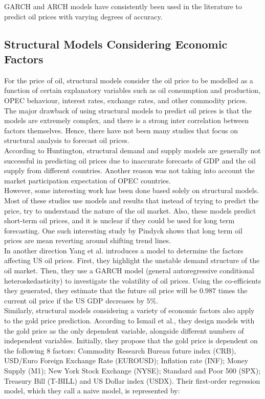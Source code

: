\documentclass[runningheads]{llncs}
\begin{document}
\noindent GARCH and ARCH models have consistently been used in the literature to predict oil prices with varying degrees of accuracy. 

\subsection{Structural Models Considering Economic Factors}

For the price of oil, structural models consider the oil price to be modelled as a function of certain explanatory variables such as oil consumption and production, OPEC behaviour, interest rates, exchange rates, and other commodity prices. The major drawback of using structural models to predict oil prices is that the models are extremely complex, and there is a strong inter correlation between factors themselves. Hence, there have not been many studies that focus on structural analysis to forecast oil prices.\\

\noindent According to Huntington\cite{huntington}, structural demand and supply models are generally not successful in predicting oil prices due to inaccurate forecasts of GDP and the oil supply from different countries. Another reason was not taking into account the market participation expectation of OPEC countries. \\

\noindent However, some interesting work has been done based solely on structural models. Most of these studies use models and results that instead of trying to predict the price, try to understand the nature of the oil market. Also, these models predict short-term oil prices, and it is unclear if they could be used for long term forecasting. One such interesting study by Pindyck\cite{pindyck} shows that long term oil prices are mean reverting around shifting trend lines. \\

\noindent In another direction Yang et al. \cite{yang} introduces a model to determine the factors affecting US oil prices. First, they highlight the unstable demand structure of the oil market. Then, they use a GARCH model (general autoregressive conditional heteroskedasticity) to investigate the volatility of oil prices. Using the co-efficients they generated, they estimate that the future oil price will be $0.987$ times the current oil price if the US GDP decreases by $5\%$. \\

\noindent Similarly, structural models considering a variety of economic factors also apply to the gold price prediction. According to Ismail et al.\cite{gold-Ismail}, they design models with the gold price as the only dependent variable, alongside different numbers of independent variables. Initially, they propose that the gold price is dependent on the following 8 factors: Commodity Research Bureau future index (CRB), USD/Euro Foreign Exchange Rate (EUROUSD); Inflation rate (INF); Money Supply (M1); New York Stock Exchange (NYSE); Standard and Poor 500 (SPX); Treasury Bill (T-BILL) and US Dollar index (USDX). Their first-order regression model, which they call a naive model, is represented by: \\
\end{document}
